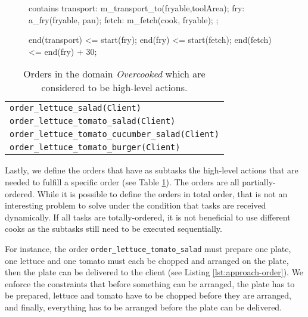 \begin{figure}
  \begin{anmlcode}
  [all] contains {
    transport: m_transport_to(fryable,toolArea);
    fry: a_fry(fryable, pan);
    fetch: m_fetch(cook, fryable);
  };
  
  end(transport) <= start(fry);
  end(fry) <= start(fetch);
  end(fetch) <= end(fry) + 30; 
  \end{anmlcode}
  \label{lst:approach-fry}
\end{figure}

\begin{table}
  \centering
  \begin{tabular}{l}
    \verb|order_lettuce_salad(Client)|\\
    \verb|order_lettuce_tomato_salad(Client)| \\
    \verb|order_lettuce_tomato_cucumber_salad(Client)|  \\
    \verb|order_lettuce_tomato_burger(Client)|
  \end{tabular}
  \caption[Orders in the domain \textit{Overcooked}]{Orders in the domain \textit{Overcooked} which are considered to be high-level actions.}
  \label{tab:approach-domain-orders}
\end{table}


Lastly, we define the orders that have as subtasks the high-level actions that are needed to fulfill a specific order (see Table \ref{tab:approach-domain-orders}).
The orders are all partially-ordered.
While it is possible to define the orders in total order, that is not an interesting problem to solve under the condition that tasks are received dynamically.
If all tasks are totally-ordered, it is not beneficial to use different cooks as the subtasks still need to be executed sequentially.

For instance, the order \verb|order_lettuce_tomato_salad| must prepare one plate, one lettuce and one tomato must each be chopped and arranged on the plate, then the plate can be delivered to the client (see Listing \ref{lst:approach-order}).
We enforce the constraints that before something can be arranged, the plate has to be prepared, lettuce and tomato have to be chopped before they are arranged, and finally, everything has to be arranged before the plate can be delivered.


